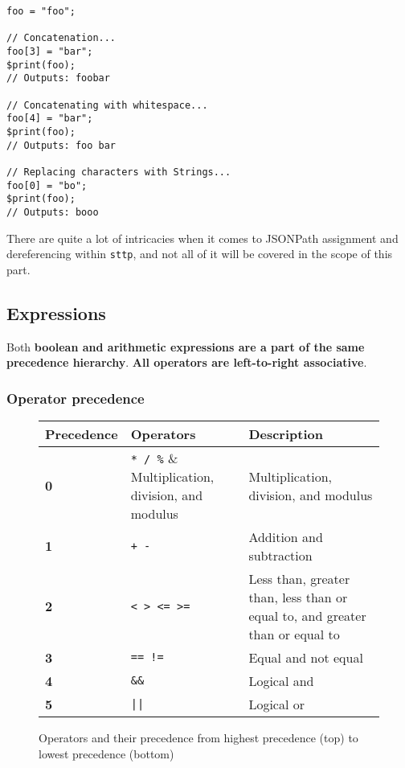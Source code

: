 \begin{verbatim}
foo = "foo";

// Concatenation...
foo[3] = "bar";
$print(foo);
// Outputs: foobar

// Concatenating with whitespace...
foo[4] = "bar";
$print(foo);
// Outputs: foo bar

// Replacing characters with Strings...
foo[0] = "bo";
$print(foo);
// Outputs: booo
\end{verbatim}

There are quite a lot of intricacies when it comes to JSONPath assignment and dereferencing within \verb|sttp|, and not all of it will be covered in the scope of this part.

\subsection{Expressions}

Both \textbf{boolean and arithmetic expressions are a part of the same precedence hierarchy}. \textbf{All operators are left-to-right associative}.

\subsubsection{Operator precedence}

\begin{figure}[H]
    \begin{center}
        \begin{tabular}{| m{2cm} | m{2cm} | m{5cm} |}
            \hline
            Precedence & Operators & Description\\
            \hline
            \textbf{0} & \verb|* / %| & Multiplication, division, and modulus\\
            \hline
            \textbf{1} & \verb|+ -| & Addition and subtraction\\
            \hline
            \textbf{2} & \verb|< > <= >=| & Less than, greater than, less than or equal to, and greater than or equal to\\
            \hline
            \textbf{3} & \verb|== !=| & Equal and not equal\\
            \hline
            \textbf{4} & \verb|&&| & Logical and\\
            \hline
            \textbf{5} & \verb+||+ & Logical or\\
            \hline
        \end{tabular}
    \end{center}
    \caption{Operators and their precedence from highest precedence (top) to lowest precedence (bottom)}
\end{figure}

